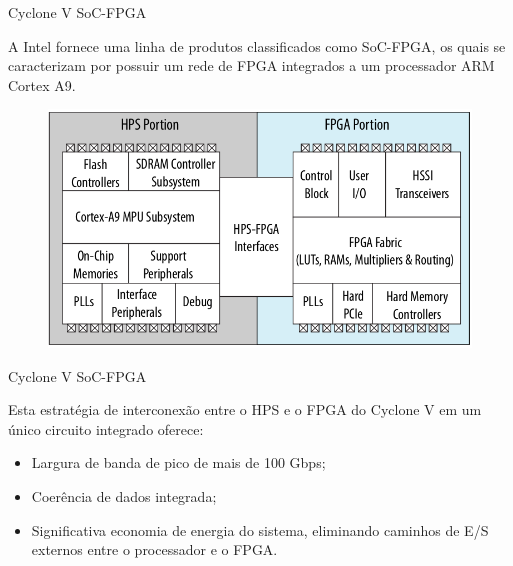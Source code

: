 \documentclass[10pt]{beamer}
\begin{document}
\begin{frame}{Cyclone V SoC-FPGA}
		\vspace{0.1cm}
		\begin{justify}
			A Intel fornece uma linha de produtos classificados como SoC-FPGA, os quais se caracterizam por possuir um rede de FPGA integrados a um processador ARM Cortex A9.
		\end{justify}
		\begin{figure}[h]
			\begin{center}
				\includegraphics[scale=0.29]{imagens/socfpga.png}\\
			\end{center}
			\label{fig:SoC}
		\end{figure}
\end{frame}

\begin{frame}{Cyclone V SoC-FPGA}
	\begin{alertblock}{}
		\vspace{0.1cm}
		\begin{justify}
			Esta estratégia de interconexão entre o HPS e o FPGA do Cyclone V em um único
			circuito integrado oferece:
		\end{justify}
		\vspace{0.25cm}
		\begin{itemize}
			\setlength\itemsep{1em}
        	\item Largura de banda de pico de mais de 100 Gbps;
        	\item Coerência de dados integrada;
        	\item Significativa economia de energia do sistema, eliminando caminhos de E/S externos
			entre o processador e o FPGA.
        \end{itemize}
	\end{alertblock}
\end{frame}
\end{document}
